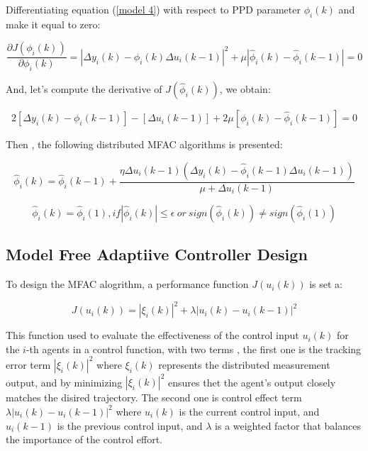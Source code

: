 \documentclass[journal,onecolumn]{IEEEtran}
\begin{document}
Differentiating equation (\ref{model 4}) with respect to PPD parameter \(\phi_i(k)\) and make it equal to zero:

\begin{equation}
    \label{model 5}
    \frac{\partial J({\phi}_i(k))}{\partial {\phi}_i(k)} = | \Delta y_i(k) - \hat{\phi}_i(k)  \Delta u_i(k-1)|^2 + \mu |\hat{\phi}_i(k) - \hat{\phi}_i(k-1)| = 0
\end{equation}


And, let's compute the derivative of \( J(\hat{\phi}_i(k)) \), we obtain:

\begin{equation}
    \label{model 6}
    2 [ \Delta y_i(k) - \phi_i(k-1)] - [\Delta u_i(k-1)] + 2 \mu [\phi_i(k) -  \hat{\phi}_i(k-1)] = 0
\end{equation}

Then , the following distributed MFAC algorithms is presented:

\begin{equation}
    \label{model eq:ppd_parameter}
    \hat{\phi}_i(k) = \hat{\phi}_i(k-1) + \frac{\eta \Delta u_i(k-1) (\Delta y_i(k) - \hat{\phi}_i(k-1) \Delta u_i(k-1))}{\mu + \Delta u_i(k-1)}
\end{equation}

\begin{equation}
    \label{model 8}
    \hat{\phi}_i(k) = \hat{\phi}_i(1), if |\hat{\phi}_i(k) | \leq \epsilon \ or \ sign(\hat{\phi}_i(k)) \neq  sign(\hat{\phi}_i(1))
\end{equation}

\subsection{Model Free Adaptiive Controller Design}

To design the MFAC alogrithm, a performance function \(J(u_i(k))\) is set a:

\begin{equation}
    \label{model 9}
    J(u_i(k)) = |\xi_i(k)|^2 + \lambda|u_i(k) - u_i(k-1)|^2
\end{equation}

This function used to evaluate the effectiveness of the control input \(u_i(k)\) for the \(i\)-th agents in a control function, with two terms , the first one is the tracking error term \(|\xi_i(k)|^2\) where \(\xi_i(k)\) represents the distributed measurement output, and by minimizing \(|\xi_i(k)|^2\) ensures thet the agent's output closely matches the disired trajectory. The second one is control effect term \(\lambda|u_i(k) - u_i(k-1)|^2\) where \(u_i(k)\) is the current control input, and \(u_i(k-1)\) is the previous control input, and \(\lambda\) is a weighted factor that balances the importance of the control effort.
\end{document}

